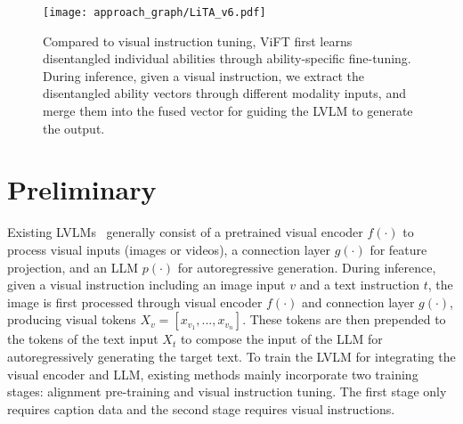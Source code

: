 \begin{figure*}[t]
    \centering
    \texttt{[image: approach\_graph/LiTA\_v6.pdf]}
    \caption{Compared to visual instruction tuning, ViFT first learns disentangled individual abilities through ability-specific fine-tuning. During inference, given a visual instruction, we extract the disentangled ability vectors through different modality inputs, and merge
    them into the fused vector for guiding the LVLM to generate the output.}
    \label{fig:LiTA}
\end{figure*}
\section{Preliminary}
Existing LVLMs~\cite{liu2024visual,he2024efficient} generally consist of a pretrained visual encoder $f(\cdot)$ to process visual inputs (\eg images or videos), a connection layer $g(\cdot)$ for feature projection, and an LLM $p(\cdot)$ for autoregressive generation.
During inference, given a visual instruction including an image input $v$ and a text instruction $t$, 
the image is first processed through visual encoder $f(\cdot)$ and connection layer $g(\cdot)$, producing visual tokens $X_v=[x_{v_1},...,x_{v_n}]$. These tokens are then prepended to the tokens of the text input $X_t$ to compose the input of the LLM for autoregressively generating the target text. 
To train the LVLM for integrating the visual encoder and LLM, existing methods mainly incorporate two training stages: alignment pre-training and visual instruction tuning. 
The first stage only requires caption data and the second stage requires visual instructions.

